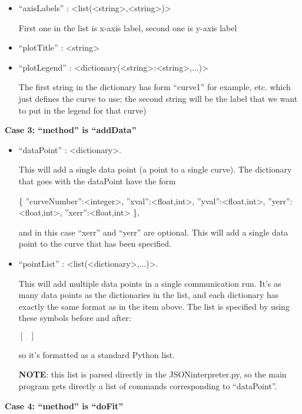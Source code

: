 \documentclass[11pt]{article} %
\begin{document}
\begin{tcolorbox}[breakable,title=Sending ``params'' to the server]
\begin{itemize}
\item ``axisLabels'' : <list(<string>,<string>)> 

First one in the list is x-axis label, second one is y-axis label

\item ``plotTitle'' : <string>

\item ``plotLegend'' : <dictionary(<string>:<string>,...)> 

The first string in the dictionary has form ``curve1'' for example, etc. which just defines the curve to use; 
the second string will be the label that we want to put in the legend for that curve)

\end{itemize}

\textbf{Case 3: ``method'' is ``addData''}
\begin{itemize}
\item ``dataPoint'' : <dictionary>. 

This will add a single data point (a point to a single curve).
The dictionary that goes with the dataPoint have the form

{ \{ {''}curveNumber{''}:<integer>, {''}xval{''}:<float,int>, {''}yval{''}:<float,int>, {''}yerr{''}:<float,int>, {''}xerr{''}:<float,int> \}}, 

and in this case ``xerr'' and ``yerr'' are optional. This will
add a single data point to the curve that has been specified.

\item  ``pointList'' : <list(<dictionary>,...)>. 

This will add multiple data points in a single communication run.
It's as many data points as the dictionaries in the list, and
each dictionary has exactly the same format as in the item above. 
The list is specified by using these symbols before and after:

{ $[ ~~~ ]$ }

so it's formatted as a standard Python list.

\textbf{NOTE}: this list is parsed directly in the JSONinterpreter.py, so the main program gets directly a list of commands corresponding to ``dataPoint''. 

\end{itemize}


\textbf{Case 4: ``method'' is ``doFit''}

\begin{itemize}


\end{itemize}
\end{tcolorbox}
\end{document}
